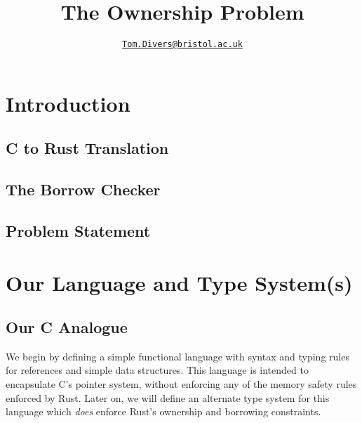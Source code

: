 \documentclass{article}
\title{The Ownership Problem}
\author{\href{mailto:oi24939@bristol.ac.uk}{\texttt{Tom.Divers@bristol.ac.uk}}}
\date{}
\begin{document}
\maketitle

\section{Introduction}

\subsection{C to Rust Translation}

\subsection{The Borrow Checker}

\subsection{Problem Statement}

\section{Our Language and Type System(s)}

\subsection{Our C Analogue}

We begin by defining a simple functional language with syntax and typing rules for references and simple data structures. This language is intended to encapsulate C's pointer system, without enforcing any of the memory safety rules enforced by Rust. Later on, we will define an alternate type system for this language which \textit{does} enforce Rust's ownership and borrowing constraints.
\end{document}
